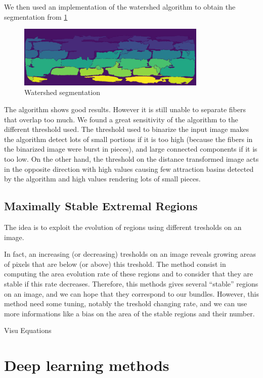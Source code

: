 \documentclass{report}
\begin{document}
We then used an implementation of the watershed algorithm to obtain the segmentation from \ref{fig:seg}

\begin{figure}[!h]
	\centering
	\includegraphics[width=9cm]{figures/Thibault/fibres_water.png}
	\caption{Watershed segmentation}
	\label{fig:seg}
\end{figure}

The algorithm shows good results. However it is still unable to separate fibers that overlap too much.\newline
We found a great sensitivity of the algorithm to the different threshold used.\newline
The threshold used to binarize the input image makes the algorithm detect lots of small portions if it is too high (because the fibers in the binarized image were burst in pieces), and large connected components if it is too low. On the other hand, the threshold on the distance transformed image acts in the opposite direction with high values causing few attraction basins detected by the algorithm and high values rendering lots of small pieces.
\section{Maximally Stable Extremal Regions}

The idea is to exploit the evolution of regions using different tresholds on an image. \newline

In fact, an increasing (or decreasing) tresholds on an image reveals growing areas of pixels that are below (or above) this treshold. The method consist in computing the area evolution rate of these regions and to consider that they are stable if this rate decreases. Therefore, this methods gives several "`stable"' regions on an image, and we can hope that they correspond to our bundles.  
However, this method need some tuning, notably the treshold changing rate, and we can use more informations like a bias on the area of the stable regions and their number.

Visu  
Equations

\chapter{Deep learning methods}
\end{document}
